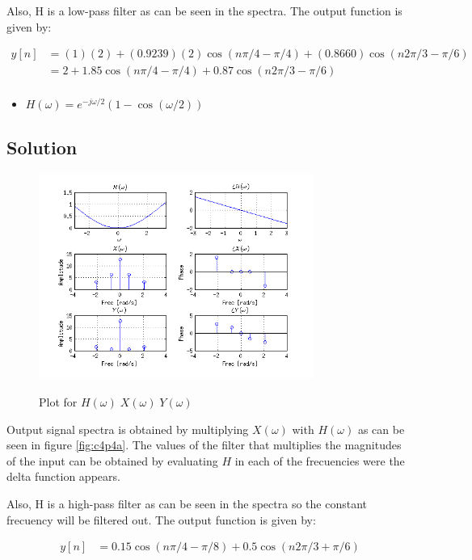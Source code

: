 Also, H is a low-pass filter as can be seen in the spectra. The
output function is given by:

\begin{equation*}
\begin{aligned}
y[n] &= (1)(2) + (0.9239)(2)\cos(n \pi/4 - \pi/4) + (0.8660) \cos(n 2\pi/3 - \pi/6 ) \\
     &= 2 + 1.85 \cos(n \pi/4 - \pi/4) + 0.87 \cos(n 2\pi/3 - \pi/6 ) \\
\end{aligned}
\end{equation*}

\begin{itemize}
\item $H(\omega) = e^{-j \omega / 2} (1 - \cos(\omega/2))$
\end{itemize} 
\subsection*{Solution}


\begin{figure}[H]
\caption{Plot for $H(\omega)\; X(\omega)\; Y(\omega)$}
\centering
\includegraphics[width=0.8\textwidth]{figs/c4p4b.png}
\label{fig:c4p4b}
\end{figure} 

Output signal spectra is obtained by multiplying $X(\omega)$ with $H(\omega)$ as
can be seen in figure \ref{fig:c4p4a}. The values of the filter that multiplies
the magnitudes of the input can be obtained by evaluating $H$ in each of 
the frecuencies were the delta function appears.

Also, H is a high-pass filter as can be seen in the spectra so the
constant frecuency will be filtered out. 
The output function is given by:

\begin{equation*}
\begin{aligned}
y[n] &= 0.15 \cos(n \pi/4 - \pi/8) + 0.5 \cos(n 2\pi/3 + \pi/6 ) \\
\end{aligned}
\end{equation*} 
